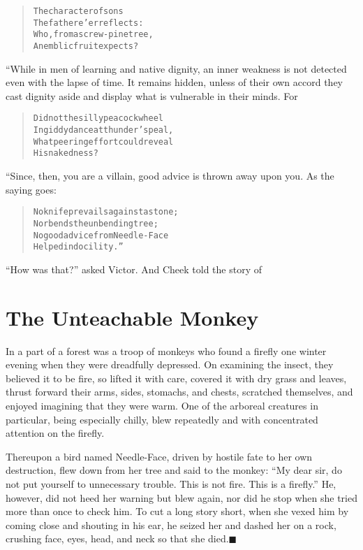 \documentclass[article, twoside, 14pt]{memoir}
\newcommand{\qed}{\hfill \ensuremath{\blacksquare}}
\renewenvironment{verbatim}{%
\begin{quote}%
\vskip -10pt%
\begin{alltt}\normalfont\large}{\end{alltt}%
\end{quote}%
\vskip -10pt
} %
\begin{document}
\begin{verbatim}
The character of sons
    The father e'er reflects:
Who, from a screw-pine tree,
    An emblic fruit expects?
\end{verbatim}
“While in men of learning and native dignity, an inner weakness is
not detected even with the lapse of time. It remains hidden, unless
of their own accord they cast dignity aside and display what is
vulnerable in their minds. For

\begin{verbatim}
Did not the silly peacock wheel
In giddy dance at thunder's peal,
What peering effort could reveal
    His nakedness?
\end{verbatim}
“Since, then, you are a villain, good advice is thrown away
upon you. As the saying goes:

\begin{verbatim}
No knife prevails against a stone;
    Nor bends the unbending tree;
No good advice from Needle-Face
    Helped indocility.”
\end{verbatim}
``How was that?'' asked Victor. And Cheek told the story of

\chapter{The Unteachable Monkey}

\label{s28}

In a part of a forest was a troop of monkeys who found a firefly
one winter evening when they were dreadfully depressed. On
examining the insect, they believed it to be fire, so lifted it
with care, covered it with dry grass and leaves, thrust forward
their arms, sides, stomachs, and chests, scratched themselves, and
enjoyed imagining that they were warm. One of the arboreal
creatures in particular, being especially chilly, blew repeatedly
and with concentrated attention on the firefly.

Thereupon a bird named Needle-Face, driven by hostile fate to her
own destruction, flew down from her tree and said to the monkey:
``My dear sir, do not put yourself to unnecessary trouble. This is not fire. This is a firefly.''
He, however, did not heed her warning but blew again, nor did he
stop when she tried more than once to check him. To cut a long
story short, when she vexed him by coming close and shouting in his
ear, he seized her and dashed her on a rock, crushing face, eyes,
head, and neck so that she died.\hyperref[s28]{\qed}
\end{document}
